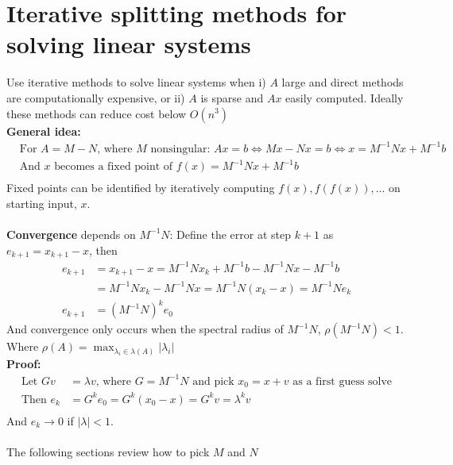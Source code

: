 \documentclass{article}
\newcommand{\abs}[1]{\lvert#1\rvert}
\begin{document}
\section{Iterative splitting methods for solving linear systems}
Use iterative methods to solve linear systems when i) $A$ large and direct methods are computationally expensive, or ii) $A$ is sparse and $Ax$ easily computed. Ideally these methods can reduce cost below $O(n^3)$\\
\textbf{General idea:}
\begin{align*}
    &\textrm{For } A = M - N \textrm{, where } M \textrm{ nonsingular: } Ax = b \Longleftrightarrow Mx - Nx = b \Longleftrightarrow x = M^{-1}Nx + M^{-1}b\\
    &\textrm{And $x$ becomes a fixed point of } f(x) = M^{-1}Nx + M^{-1}b\\
\end{align*}
Fixed points can be identified by iteratively computing $f(x), f(f(x)), \dots$ on starting input, $x$.\\\\
\textbf{Convergence} depends on $M^{-1}N$: Define the error at step $k+1$ as $e_{k+1} = x_{k+1} - x$, then
\begin{align*}
    e_{k+1} &= x_{k+1} - x = M^{-1}Nx_{k} + M^{-1}b - M^{-1}Nx - M^{-1}b\\
    &= M^{-1}Nx_{k} - M^{-1}Nx = M^{-1}N(x_{k} - x) = M^{-1}Ne_k\\
    e_{k+1} &= (M^{-1}N)^ke_0
\end{align*}
And convergence only occurs when the spectral radius of $M^{-1}N$, $\rho(M^{-1}N)<1$. Where $\rho(A) = \max_{\lambda_i \in \lambda(A)} \abs{\lambda_i}$\\
\textbf{Proof:}
\begin{align*}
    \textrm{Let } Gv&=\lambda v \textrm{, where } G = M^{-1}N \textrm{ and pick } x_0 = x + v \textrm{ as a first guess solve}\\
    \textrm{Then } e_k &= G^ke_0 = G^k(x_0 - x) = G^kv = \lambda^kv\\
\end{align*}
And $e_k \rightarrow 0$ if $\abs{\lambda} < 1$.\\\\
The following sections review how to pick $M$ and $N$
\end{document}
